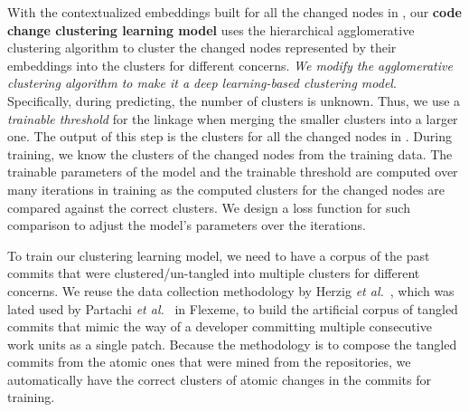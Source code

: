 

With the contextualized embeddings built for all the changed nodes in
{\mvpdg}, our {\bf code change clustering learning model} uses the
hierarchical agglomerative clustering algorithm to cluster the changed
nodes represented by their embeddings into the clusters for different
concerns. {\em We modify the agglomerative clustering algorithm to
  make it a deep learning-based clustering model}. Specifically,
during predicting, the number of clusters is unknown. Thus, we use a
{\em trainable threshold} for the linkage when merging the smaller
clusters into a larger one. The output of this step is the clusters
for all the changed nodes in {\mvpdg}. During training, we know the
clusters of the changed nodes from the training data. The trainable
parameters of the model and the trainable threshold are computed over
many iterations in training as the computed clusters for the changed
nodes are compared against the correct clusters. We design a loss
function for such comparison to adjust the model's parameters over the
iterations.

 To train our clustering
learning model, we need to have a corpus of the past commits that were
clustered/un-tangled into multiple clusters for different concerns. We
reuse the data collection methodology by Herzig {\em et
  al.}~\cite{kim-emse16}, which was lated used by Partachi {\em et
  al.}~\cite{flexeme-fse20} in Flexeme, to build the artificial corpus
of tangled commits that mimic the way of a developer committing
multiple consecutive work units as a single patch. Because the
methodology is to compose the tangled commits from the atomic ones
that were mined from the repositories, we automatically have the
correct clusters of atomic changes in the commits for training.



